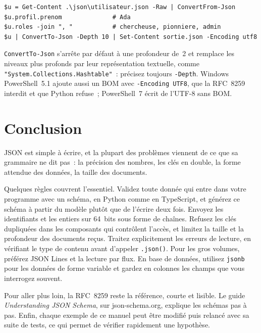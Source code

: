 \documentclass[12pt,a4paper]{article}
\begin{document}
\begin{lstlisting}[caption={Lire et écrire du JSON en PowerShell}]
$u = Get-Content .\json\utilisateur.json -Raw | ConvertFrom-Json
$u.profil.prenom              # Ada
$u.roles -join ", "           # chercheuse, pionniere, admin
$u | ConvertTo-Json -Depth 10 | Set-Content sortie.json -Encoding utf8
\end{lstlisting}

\texttt{ConvertTo-Json} s'arrête par défaut à une profondeur de~2 et remplace les niveaux plus profonds par leur représentation textuelle, comme \texttt{"System.Collections.Hashtable"}~: précisez toujours \texttt{-Depth}. Windows PowerShell~5.1 ajoute aussi un BOM avec \texttt{-Encoding UTF8}, que la RFC~8259 interdit et que Python refuse~; PowerShell~7 écrit de l'UTF-8 sans BOM.

\section{Conclusion}
JSON est simple à écrire, et la plupart des problèmes viennent de ce que sa grammaire ne dit pas~: la précision des nombres, les clés en double, la forme attendue des données, la taille des documents.

Quelques règles couvrent l'essentiel. Validez toute donnée qui entre dans votre programme avec un schéma, en Python comme en TypeScript, et générez ce schéma à partir du modèle plutôt que de l'écrire deux fois. Envoyez les identifiants et les entiers sur 64~bits sous forme de chaînes. Refusez les clés dupliquées dans les composants qui contrôlent l'accès, et limitez la taille et la profondeur des documents reçus. Traitez explicitement les erreurs de lecture, en vérifiant le type de contenu avant d'appeler \texttt{.json()}. Pour les gros volumes, préférez JSON Lines et la lecture par flux. En base de données, utilisez \texttt{jsonb} pour les données de forme variable et gardez en colonnes les champs que vous interrogez souvent.

Pour aller plus loin, la RFC~8259 reste la référence, courte et lisible. Le guide \textit{Understanding JSON Schema}, sur json-schema.org, explique les schémas pas à pas. Enfin, chaque exemple de ce manuel peut être modifié puis relancé avec sa suite de tests, ce qui permet de vérifier rapidement une hypothèse.

\end{document}
